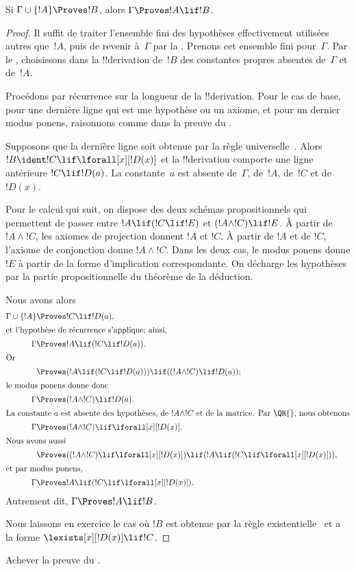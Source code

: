 \documentclass[../../../include/open-logic-section]{subfiles}
\begin{document}


\begin{thm}
Si $\Gamma \cup \{!A\} \Proves !B$, alors
$\Gamma \Proves !A \lif !B$.
\end{thm}

\begin{proof}
Il suffit de traiter l'ensemble fini des hypothèses effectivement
utilisées autres que~$!A$, puis de revenir à~$\Gamma$ par la
. Prenons cet ensemble fini pour~$\Gamma$.
Par le , choisissons dans la
!!{derivation} de~$!B$ des constantes propres absentes de~$\Gamma$ et
de~$!A$.

Procédons par récurrence sur la longueur de la !!{derivation}.
Pour le cas de base, pour une dernière ligne qui est une hypothèse
ou un axiome, et pour un dernier modus ponens, raisonnons comme
dans la preuve du .

Supposons que la dernière ligne soit obtenue par la règle
universelle~\QR. Alors $!B \ident !C \lif \lforall[x][!D(x)]$ et la
!!{derivation} comporte une ligne antérieure $!C \lif !D(a)$.
La constante~$a$ est absente de~$\Gamma$, de~$!A$, de~$!C$ et de~$!D(x)$.

Pour le calcul qui suit, on dispose des deux schémas propositionnels
qui permettent de passer entre
$!A \lif (!C \lif !E)$ et $(!A \land !C) \lif !E$.
À partir de $!A \land !C$, les axiomes de projection donnent $!A$ et
$!C$. À partir de $!A$ et de $!C$, l'axiome de conjonction donne
$!A \land !C$. Dans les deux cas, le modus ponens donne $!E$ à partir
de la forme d'implication correspondante. On décharge les hypothèses
par la partie propositionnelle du théorème de la déduction.

Nous avons alors
\begin{align*}
  \Gamma \cup \{!A\} & \Proves !C \lif !D(a),\\
  \intertext{et l'hypothèse de récurrence s'applique; ainsi,}
    \Gamma & \Proves !A \lif (!C \lif !D(a)).\\
  \intertext{Or}
  & \Proves (!A \lif (!C \lif !D(a))) \lif ((!A \land !C) \lif !D(a));\\
  \intertext{le modus ponens donne donc}
  \Gamma & \Proves (!A \land !C) \lif !D(a).\\
  \intertext{La constante~$a$ est absente des hypothèses, de $!A\land !C$ et de la matrice. Par~\QR{}, nous obtenons}
    \Gamma & \Proves (!A \land !C) \lif \lforall[x][!D(x)].\\
  \intertext{Nous avons aussi}
  & \Proves ((!A \land !C) \lif \lforall[x][!D(x)])
    \lif (!A \lif (!C \lif \lforall[x][!D(x)])),\\
  \intertext{et par modus ponens,}
    \Gamma & \Proves !A \lif (!C \lif \lforall[x][!D(x)]).
\end{align*}
Autrement dit, $\Gamma \Proves !A \lif !B$.

Nous laissons en exercice le cas où $!B$ est obtenue par la règle
existentielle~\QR{} et a la forme $\lexists[x][!D(x)] \lif !C$.
\end{proof}

\begin{prob}
Achever la preuve du
.
\end{prob}
\end{document}
